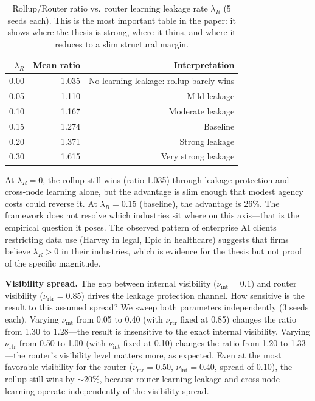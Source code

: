 \documentclass[12pt]{article}
\theoremstyle{definition}
\begin{document}
\begin{table}[H]
\centering
\caption{Rollup/Router ratio vs.\ router learning leakage rate $\lambda_R$ (5 seeds each). This is the most important table in the paper: it shows where the thesis is strong, where it thins, and where it reduces to a slim structural margin.}
\label{tab:lr_sensitivity}
\begin{tabular}{rrr}
\toprule
$\lambda_R$ & Mean ratio & Interpretation \\
\midrule
0.00 & 1.035 & No learning leakage: rollup barely wins \\
0.05 & 1.110 & Mild leakage \\
0.10 & 1.167 & Moderate leakage \\
0.15 & 1.274 & Baseline \\
0.20 & 1.371 & Strong leakage \\
0.30 & 1.615 & Very strong leakage \\
\bottomrule
\end{tabular}
\end{table}

\noindent At $\lambda_R = 0$, the rollup still wins (ratio 1.035) through leakage protection and cross-node learning alone, but the advantage is slim enough that modest agency costs could reverse it. At $\lambda_R = 0.15$ (baseline), the advantage is 26\%. The framework does not resolve which industries sit where on this axis---that is the empirical question it poses. The observed pattern of enterprise AI clients restricting data use (Harvey in legal, Epic in healthcare) suggests that firms believe $\lambda_R > 0$ in their industries, which is evidence for the thesis but not proof of the specific magnitude.

\textbf{Visibility spread.} The gap between internal visibility ($\nu_{\text{int}} = 0.1$) and router visibility ($\nu_{\text{rtr}} = 0.85$) drives the leakage protection channel. How sensitive is the result to this assumed spread? We sweep both parameters independently (3 seeds each). Varying $\nu_{\text{int}}$ from 0.05 to 0.40 (with $\nu_{\text{rtr}}$ fixed at 0.85) changes the ratio from 1.30 to 1.28---the result is insensitive to the exact internal visibility. Varying $\nu_{\text{rtr}}$ from 0.50 to 1.00 (with $\nu_{\text{int}}$ fixed at 0.10) changes the ratio from 1.20 to 1.33---the router's visibility level matters more, as expected. Even at the most favorable visibility for the router ($\nu_{\text{rtr}} = 0.50$, $\nu_{\text{int}} = 0.40$, spread of 0.10), the rollup still wins by $\sim$20\%, because router learning leakage and cross-node learning operate independently of the visibility spread.
\end{document}
